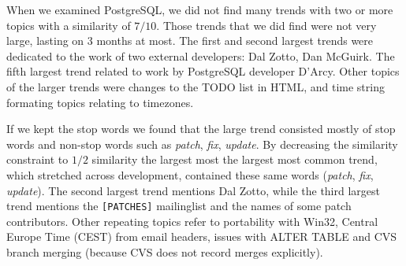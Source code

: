 \documentclass[times, 10pt,twocolumn]{article}
\begin{document}

When we examined PostgreSQL, we did not find many trends with two or
more topics with a similarity of $7/10$. Those trends that we did find
were not very large, lasting on 3 months at most. The first and second
largest trends were dedicated to the work of two external developers:
Dal Zotto, Dan McGuirk. The fifth largest trend related to work by
PostgreSQL developer D'Arcy. Other topics of the larger trends were
changes to the TODO list in HTML, and time string formating topics
relating to timezones.

If we kept the stop words we found that the large trend consisted
mostly of stop words and non-stop words such as \emph{patch},
\emph{fix}, \emph{update}.  By decreasing the similarity constraint to
$1/2$ similarity the largest most the largest most common trend, which
stretched across development, contained these same words
(\emph{patch}, \emph{fix}, \emph{update}). The second largest trend
mentions Dal Zotto, while the third largest trend mentions the
\texttt{[PATCHES]} mailinglist and the names of some patch
contributors.  Other repeating topics refer to portability with Win32,
Central Europe Time (CEST) from email headers, issues with ALTER TABLE
and CVS branch merging (because CVS does not record merges explicitly).





\end{document}
